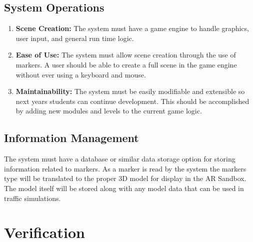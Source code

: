 \documentclass[letterpaper, 10pt, onecolumn, draftclsnofoot]{IEEEtran}
\begin{document}
    \subsection{\textbf{System Operations}}
    \begin{enumerate}[\label={}]         
        \item{\textbf{Scene Creation:} The system must have a game engine to handle graphics, user input, and general run time logic.}
        
        \item{\textbf{Ease of Use:} The system must allow scene creation through the use of markers. A user should be able to create a full scene in the game engine without ever using a keyboard and mouse.}
        
        \item{\textbf{Maintainability:} The system must be easily modifiable and extensible so next years students can continue development. This should be accomplished by adding new modules and levels to the current game logic.}
    \end{enumerate}
    
    \subsection{\textbf{Information Management}}
    The system must have a database or similar data storage option for storing information related to markers. As a marker is read by the system the markers type will be translated to the proper 3D model for display in the AR Sandbox. The model itself will be stored along with any model data that can be used in traffic simulations. 
    
\section{Verification}
\end{document}
